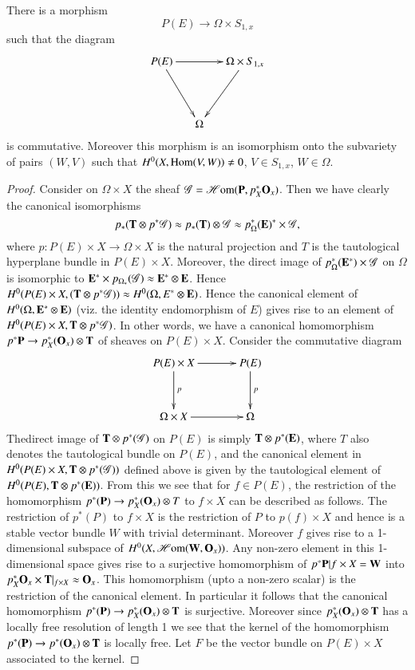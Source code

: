 \begin{proposition}\label{art17-prop7.1}
There is a morphism
$$
P(E)\to \Omega\times S_{1,x}
$$
such that the diagram
\[
\xymatrix@C=.5cm@R=1.5cm{
P(E)\ar[rr]\ar[dr] & & \Omega\times S_{1,x}\ar[dl]\\
 & \Omega &
}
\]
is commutative. Moreover this morphism is an isomorphism onto the subvariety of pairs $(W,V)$ such that $H^{0}(X,\operatorname{\mathrm{Hom}}(V,W))\neq 0$, $V\in S_{1,x}$, $W\in \Omega$.
\end{proposition}

\begin{proof}
Consider on $\Omega\times X$ the sheaf $\mathscr{G}=\operatorname{\mathscr{H}\mathrm{om}} (\mathbf{P},p^{*}_{X}\mathbf{O}_{x})$. Then we have clearly the canonical isomorphisms
$$
p_{*}(\mathbf{T}\otimes p^{*}\mathscr{G})\approx p_{*}(\mathbf{T})\otimes \mathscr{G}\approx p^{*}_{\Omega}(\mathbf{E})^{*}\times \mathscr{G},
$$
where $p:P(E)\times X\to \Omega\times X$ is the natural projection and $T$ is the tautological hyperplane bundle in $P(E)\times X$. Moreover, the direct image of $p^{*}_{\Omega}(\mathbf{E}^{*})\times \mathscr{G}$ on $\Omega$ is isomorphic to $\mathbf{E}^{*}\times p_{\Omega_{*}}(\mathscr{G})\approx \mathbf{E}^{*}\otimes \mathbf{E}$. Hence $H^{0}(P(E)\times X, (\mathbf{T}\otimes p^{*}\mathscr{G}))\approx H^{0}(\Omega,E^{*}\otimes \mathbf{E})$. Hence the canonical element of $H^{0}(\Omega,\mathbf{E}^{*}\otimes \mathbf{E})$ (viz. the identity endomorphism of $E$) gives rise to an element of $H^{0}(P(E)\times X,\mathbf{T}\otimes p^{*}\mathscr{G})$. In other words, we have a canonical homomorphism $p^{*}\mathbf{P}\to p^{*}_{X}(\mathbf{O}_{x})\otimes \mathbf{T}$ of sheaves on $P(E)\times X$. Consider the commutative diagram
\[
\xymatrix@=1.2cm{
P(E)\times X\ar[d]^-{p}\ar[r] & P(E)\ar[d]^-{p}\\
\Omega\times X\ar[r] & \Omega
}
\]
The\pageoriginale direct image of $\mathbf{T}\otimes p^{*}(\mathscr{G})$ on $P(E)$ is simply $\mathbf{T}\otimes p^{*}(\mathbf{E})$, where $T$ also denotes the tautological bundle on $P(E)$, and the canonical element in $H^{0}(P(E)\times X,\mathbf{T}\otimes p^{*}(\mathscr{G}))$ defined above is given by the tautological element of $H^{0}(P(E),\mathbf{T}\otimes p^{*}(\mathbf{E}))$. From this we see that for $f\in P(E)$, the restriction of the homomorphism $p^{*}(\mathbf{P})\to p^{*}_{X}(\mathbf{O}_{x})\otimes T$ to $f\times X$ can be described as follows. The restriction of $p^{*}(P)$ to $f\times X$ is the restriction of $P$ to $p(f)\times X$ and hence is a stable vector bundle $W$ with trivial determinant. Moreover $f$ gives rise to a 1-dimensional subspace of $H^{0}(X,\operatorname{\mathscr{H}\mathrm{om}}(\mathbf{W},\mathbf{O}_{x}))$. Any non-zero element in this 1-dimensional space gives rise to a surjective homomorphism of $p^{*}\mathbf{P}|f\times X=\mathbf{W}$ into $p^{*}_{X}\mathbf{O}_{x}\times \mathbf{T}|_{f\times X}\approx \mathbf{O}_{x}$. This homomorphism (upto a non-zero scalar) is the restriction of the canonical element. In particular it follows that the canonical homomorphism $p^{*}(\mathbf{P})\to p^{*}_{X}(\mathbf{O}_{x})\otimes \mathbf{T}$ is surjective. Moreover since $p^{*}_{X}(\mathbf{O}_{x})\otimes \mathbf{T}$ has a locally free resolution of length 1 we see that the kernel of the homomorphism $p^{*}(\mathbf{P})\to p^{*}(\mathbf{O}_{x})\otimes \mathbf{T}$ is locally free. Let $F$ be the vector bundle on $P(E)\times X$ associated to the kernel.
\end{proof}

